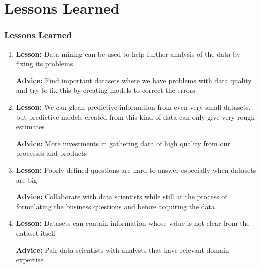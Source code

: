 \documentclass[10pt]{beamer}
\begin{document}
\section{Lessons Learned}

\begin{frame}
\frametitle{Lessons Learned}

\begin{enumerate}
    \item

        \textbf{Lesson:} Data mining can be used to help further analysis of the data by fixing its problems

    \pause
        \textbf{Advice:} Find important datasets where we have problems with data quality and try to fix this
        by creating models to correct the errors
        
    \item

    \pause
        \textbf{Lesson:} We can glean predictive information from even very small datasets, but predictive models
        created from this kind of data can only give very rough estimates

    \pause
        \textbf{Advice:} More investments in gathering data of high quality from our processes and products

    \pause
    \item

    \pause
        \textbf{Lesson:} Poorly defined questions are hard to answer especially when datasets are big

    \pause
        \textbf{Advice:} Collaborate with data scientists while still at the process of formulating
        the business questions and before acquiring the data

    \pause
    \item

    \pause
        \textbf{Lesson:} Datasets can contain information whose value is not clear from the dataset itself

    \pause
        \textbf{Advice:} Pair data scientists with analysts that have relevant domain expertise

\end{enumerate}

\end{frame}

\end{document}
